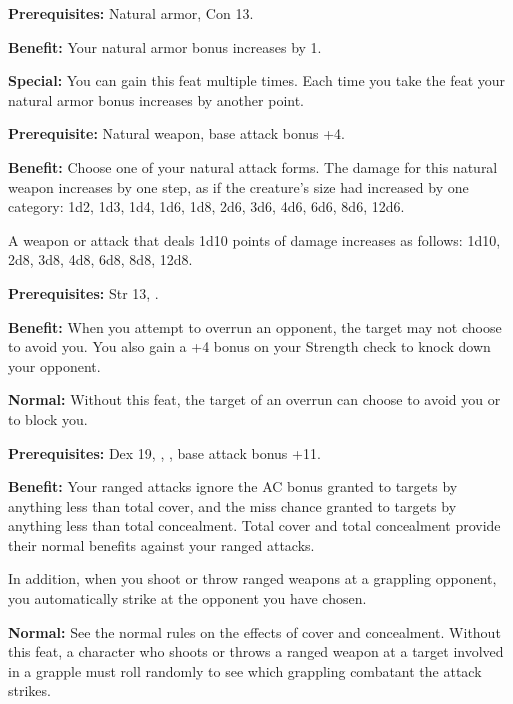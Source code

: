 
\textbf{Prerequisites:} Natural armor, Con 13.

\textbf{Benefit:} Your natural armor bonus increases by 1.

\textbf{Special:} You can gain this feat multiple times. Each time you
take the feat your natural armor bonus increases by another point.


\textbf{Prerequisite:} Natural weapon, base attack bonus +4.

\textbf{Benefit:} Choose one of your natural attack forms. The damage 
for this natural weapon increases by one step, as if the creature's size had increased 
by one category: 1d2, 1d3, 1d4, 1d6, 1d8, 2d6, 3d6, 4d6, 6d6, 8d6, 12d6. 

A weapon or attack that deals 1d10 points of damage increases as follows: 1d10, 
2d8, 3d8, 4d8, 6d8, 8d8, 12d8.


\textbf{Prerequisites:} Str 13, .

\textbf{Benefit:} When you attempt to overrun an opponent, the target may not choose 
to avoid you. You also gain a +4 bonus on your Strength check to knock down your 
opponent.

\textbf{Normal:} Without this feat, the target of an overrun can choose to avoid 
you or to block you.


\textbf{Prerequisites:} Dex 19, , , base attack bonus 
+11.

\textbf{Benefit:} Your ranged attacks ignore the AC bonus granted to targets by 
anything less than total cover, and the miss chance granted to targets by anything 
less than total concealment. Total cover and total concealment provide their normal 
benefits against your ranged attacks.

In addition, when you shoot or throw ranged weapons at a grappling opponent, you 
automatically strike at the opponent you have chosen.

\textbf{Normal:} See the normal rules on the effects of cover and concealment. 
Without this feat, a character who shoots or throws a ranged weapon at a target 
involved in a grapple must roll randomly to see which grappling combatant the attack 
strikes.

